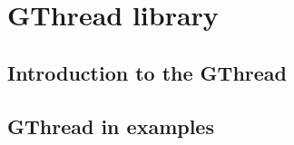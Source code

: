 
\section{GThread library}
\label{gthread}

\subsection{Introduction to the GThread}

\subsection{GThread in examples}


